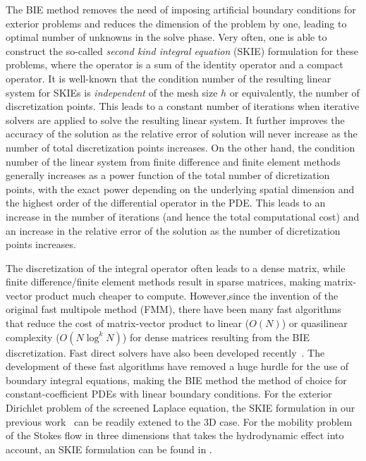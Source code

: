 The BIE method removes the need of imposing artificial boundary conditions
for exterior problems
and reduces the dimension of the problem by one, leading to optimal number of unknowns
in the solve phase. Very often, one is able to construct the so-called
{\it second kind integral equation} (SKIE) formulation for these problems,
where the operator is a sum of the identity operator and a compact operator.
It is well-known that the condition number of the
resulting linear system for SKIEs is {\it independent} of the mesh size $h$ or equivalently,
the number of discretization points. This leads to
a constant number of iterations when iterative solvers are applied to solve
the resulting linear system. It further
improves the accuracy of the solution as the relative error of solution
will never increase as the number of total discretization points increases.
On the other hand, the condition
number of the linear system from finite difference and finite element methods generally
increases as a power function of the total number of dicretization points, with
the exact power depending on the underlying spatial dimension and the highest
order of the differential operator in the PDE. This leads to an increase in the number
of iterations (and hence the total computational cost) and an increase in the relative
error of the solution as the number of dicretization points increases.

The discretization of the integral operator often leads to a dense matrix,
while finite difference/finite element methods result in sparse matrices,
making matrix-vector product much cheaper to compute. However,since the invention
of the original fast multipole method (FMM)\cite{fmm5}, there
have been many fast algorithms~\cite{fmm1,fmm2,fmm3,fmm4,fmm6,fmm7,fmm8}
that reduce the cost of matrix-vector product
to linear ($O(N)$) or quasilinear complexity ($O(N \log^kN)$) for dense matrices resulting
from the BIE discretization.
Fast direct solvers have also been developed
recently~\cite{fds1,fds2,fds3,fds4,fds5,fds6,fds7,fds8,ho2016cpam2,ho2016cpam1,minden2016,minden2017siammms}.
The development of these fast algorithms have removed a huge
hurdle for the use of boundary integral equations, making the BIE method the method
of choice for constant-coefficient PDEs with linear boundary conditions. For the exterior
Dirichlet problem of the screened Laplace equation, the SKIE formulation in our previous
work~\cite{Fu19} can be readily extened to the 3D case. For the mobility problem
of the Stokes flow in three dimensions that
takes the hydrodynamic effect into account, an SKIE formulation
can be found in \cite{manasthesis}.

